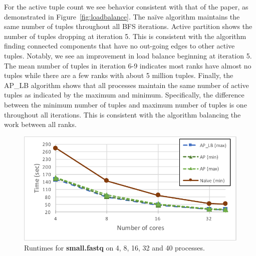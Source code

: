 \documentclass[11pt]{elsarticle}
\begin{document}
For the active tuple count we see behavior consistent with that of the paper, as demonstrated in Figure~\ref{fig:loadbalance}. The na{\"i}ve algorithm maintains the same number of tuples throughout all BFS iterations. Active partition shows the number of tuples dropping at iteration 5. This is consistent with the algorithm finding connected components that have no out-going edges to other active tuples. Notably, we see an improvement in load balance beginning at iteration 5. The mean number of tuples in iteration 6-9 indicates most ranks have almost no tuples while there are a few ranks with about 5 million tuples. Finally, the AP\_LB algorithm shows that all processes maintain the same number of active tuples as indicated by the maximum and minimum. Specifically, the difference between the minimum number of tuples and maximum number of tuples is one throughout all iterations. This is consistent with the algorithm balancing the work between all ranks.
\begin{figure}[htp]
\centering
\includegraphics[width=.9\textwidth]{allruntimes}
\caption{Runtimes for \textbf{small.fastq} on 4, 8, 16, 32 and 40 processes.}
\label{fig:runtimes}
\end{figure}
\end{document}
